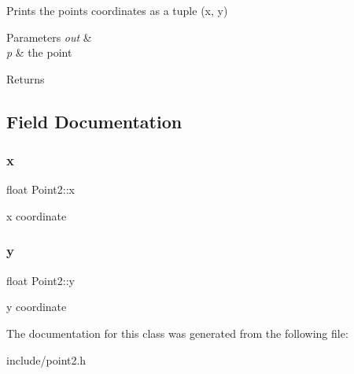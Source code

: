 Prints the point\textquotesingle{}s coordinates as a tuple (x, y) 


\begin{DoxyParams}{Parameters}
{\em out} & \\
\hline
{\em p} & the point \\
\hline
\end{DoxyParams}
\begin{DoxyReturn}{Returns}

\end{DoxyReturn}


\subsection{Field Documentation}
\mbox{\label{class_point2_a230f49d24800fd2682c9c96a7156057a}} 
\subsubsection{\texorpdfstring{x}{x}}
{\footnotesize\ttfamily float Point2\+::x}



x coordinate 

\mbox{\label{class_point2_a72a62f27138bc247e86cddb3dfc7c6b2}} 
\subsubsection{\texorpdfstring{y}{y}}
{\footnotesize\ttfamily float Point2\+::y}



y coordinate 



The documentation for this class was generated from the following file\+:\begin{DoxyCompactItemize}
\item 
include/point2.\+h\end{DoxyCompactItemize}
